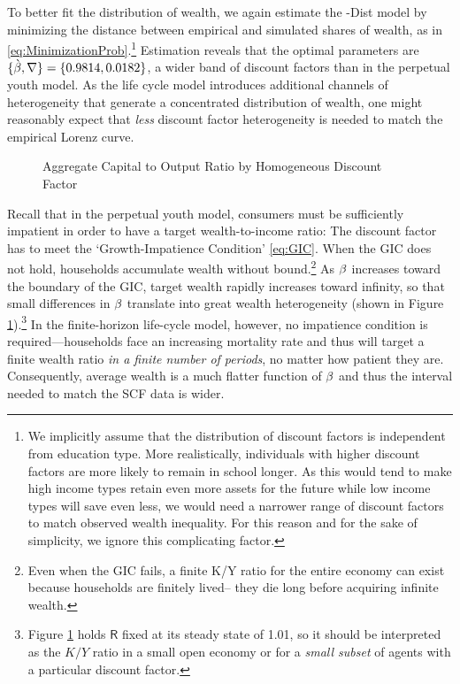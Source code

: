\documentclass[12pt,titlepage]{econtex}
\begin{document}
To better fit the distribution of wealth, we again estimate the \Discount-Dist model by minimizing the distance between empirical and simulated shares of wealth, as in \eqref{eq:MinimizationProb}.\footnote{We implicitly assume that the distribution of discount factors is independent from education type.  More realistically, individuals with higher discount factors are more likely to remain in school longer.  As this would tend to make high income types retain even more assets for the future while low income types will save even less, we would need a narrower range of discount factors to match observed wealth inequality.  For this reason and for the sake of simplicity, we ignore this complicating factor.}   Estimation reveals that the optimal parameters are $\{\grave{\beta},\nabla\} = \{0.9814, 0.0182\}$, a wider band of discount factors than in the perpetual youth model.  As the life cycle model introduces additional channels of heterogeneity that generate a concentrated distribution of wealth, one might reasonably expect that \textit{less} discount factor heterogeneity is needed to match the empirical Lorenz curve.

\begin{figure}
\caption{Aggregate Capital to Output Ratio by Homogeneous Discount Factor}
\label{KYratioByBeta}
\end{figure}

Recall that in the perpetual youth model, consumers must be sufficiently impatient in order to have a target wealth-to-income ratio: The discount factor has to meet the `Growth-Impatience Condition' \eqref{eq:GIC}. When the GIC does not hold, households accumulate wealth without bound.\footnote{Even when the GIC fails, a finite K/Y ratio for the entire economy can exist because households are finitely lived-- they die long before acquiring infinite wealth.}  As $\beta$ increases toward the boundary of the GIC, target wealth rapidly increases toward infinity, so that small differences in $\beta$ translate into great wealth heterogeneity (shown in Figure \ref{KYratioByBeta}).\footnote{Figure \ref{KYratioByBeta} holds $\mathsf{R}$ fixed at its steady state of 1.01, so it should be interpreted as the $K/Y$ ratio in a small open economy or for a \textit{small subset} of agents with a particular discount factor.}  In the finite-horizon life-cycle model, however, no impatience condition is required---households face an increasing mortality rate and thus will target a finite wealth ratio \textit{in a finite number of periods}, no matter how patient they are. Consequently, average wealth is a much flatter function of $\beta$ and thus the interval needed to match the SCF data is wider.
\end{document}
